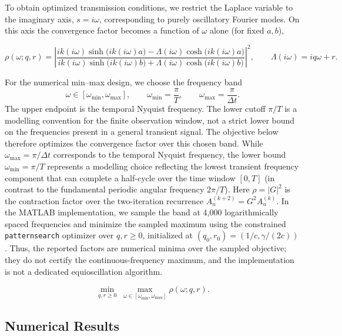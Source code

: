 \documentclass{Configuration_Files/PoliMi3i_thesis}
\newif\ifshowthesischanges
\DeclareRobustCommand{\thesischange}[2]{%
    \ifshowthesischanges
        \textcolor{#1}{#2}%
    \else
        #2%
    \fi
}
\def\thesischange#1#2{#2}%
\begin{document}
To obtain optimized transmission conditions, we restrict the Laplace
variable to the imaginary axis, $s=i\omega$, corresponding to purely
oscillatory Fourier modes. On this axis the convergence factor becomes a
function of $\omega$ alone (for fixed $a,b$),

\begin{equation*}
\rho(\omega;q,r)
=
\left|
\frac{
ik(i\omega)\sinh\bigl(ik(i\omega)a\bigr)
-
\Lambda(i\omega)\cosh\bigl(ik(i\omega)a\bigr)
}{
ik(i\omega)\sinh\bigl(ik(i\omega)b\bigr)
+
\Lambda(i\omega)\cosh\bigl(ik(i\omega)b\bigr)
}
\right|^2,
\qquad
\Lambda(i\omega)=iq\omega+r.
\end{equation*}

For the numerical min--max design, we choose the frequency band
\[
\omega\in[\omega_{\min},\omega_{\max}],
\qquad
\omega_{\min}=\frac{\pi}{T},
\qquad
\omega_{\max}=\frac{\pi}{\Delta t}.
\]
The upper endpoint is the temporal Nyquist frequency. The lower cutoff $\pi/T$ is a modelling convention for the finite observation window, not a strict lower bound on the frequencies present in a general transient signal. The objective below therefore optimizes the convergence factor over this chosen band.
\thesischange{blue}{While $\omega_{\max} = \pi/\Delta t$ corresponds to the temporal Nyquist frequency, the lower bound $\omega_{\min} = \pi/T$ represents a modelling choice reflecting the lowest transient frequency component that can complete a half-cycle over the time window $[0,T]$ (in contrast to the fundamental periodic angular frequency $2\pi/T$). Here $\rho=|G|^2$ is the contraction factor over the two-iteration recurrence $A_u^{(k+2)}=G^2A_u^{(k)}$. In the MATLAB implementation, we sample the band at 4,000 logarithmically spaced frequencies and minimize the sampled maximum using the constrained \texttt{patternsearch} optimizer \citep{mathworks_patternsearch_docs} over $q,r\ge0$, initialized at $(q_0,r_0)=(1/c,\gamma/(2c))$. Thus, the reported factors are numerical minima over the sampled objective; they do not certify the continuous-frequency maximum, and the implementation is not a dedicated equioscillation algorithm.}

\begin{equation}
\operatorname*{min}_{q,r\ge0}
\;
\max_{\omega\in[\omega_{\min},\omega_{\max}]}
\rho(\omega;q,r).
\label{eq:minmax}
\end{equation}

\subsection{Numerical Results}
\end{document}
